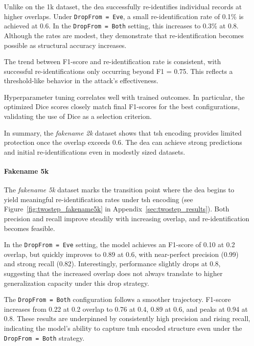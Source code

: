 Unlike on the 1k dataset, the \ac{dea} successfully re-identifies individual records at higher overlaps. Under \texttt{DropFrom = Eve}, a small re-identification rate of 0.1\% is achieved at 0.6.
In the \texttt{DropFrom = Both} setting, this increases to 0.3\% at 0.8.
Although the rates are modest, they demonstrate that re-identification becomes possible as structural accuracy increases.

The trend between F1-score and re-identification rate is consistent, with successful re-identifications only occurring beyond F1 = 0.75.
This reflects a threshold-like behavior in the attack's effectiveness.

Hyperparameter tuning correlates well with trained outcomes.
In particular, the optimized Dice scores closely match final F1-scores for the best configurations, validating the use of Dice as a selection criterion.

In summary, the \textit{fakename 2k} dataset shows that \ac{tsh} encoding provides limited protection once the overlap exceeds 0.6.
The \ac{dea} can achieve strong predictions and initial re-identifications even in modestly sized datasets.


\paragraph{Fakename 5k}

The \textit{fakename 5k} dataset marks the transition point where the \ac{dea} begins to yield meaningful re-identification rates under \ac{tsh} encoding (see Figure~\ref{fig:twostep_fakename5k} in Appendix~\ref{sec:twostep_results}).
Both precision and recall improve steadily with increasing overlap, and re-identification becomes feasible.

In the \texttt{DropFrom = Eve} setting, the model achieves an F1-score of 0.10 at 0.2 overlap, but quickly improves to 0.89 at 0.6, with near-perfect precision (0.99) and strong recall (0.82).
Interestingly, performance slightly drops at 0.8, suggesting that the increased overlap does not always translate to higher generalization capacity under this drop strategy.

The \texttt{DropFrom = Both} configuration follows a smoother trajectory.
F1-score increases from 0.22 at 0.2 overlap to 0.76 at 0.4, 0.89 at 0.6, and peaks at 0.94 at 0.8.
These results are underpinned by consistently high precision and rising recall, indicating the model's ability to capture \ac{tmh} encoded structure even under the \texttt{DropFrom = Both} strategy.


